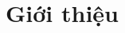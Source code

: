 \documentclass{article} %
\begin{document}


% 

% 

% 

% 

% 



% 

% 

% 

% 

% 

% 

% 

% 

% 


\section{Giới thiệu}

% 


% 




% 
\end{document}
